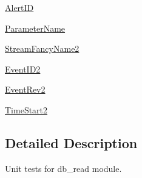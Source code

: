 \begin{DoxyCompactItemize}
\item 
\hyperlink{classamonpy_1_1dbase_1_1test_1_1test__db__read_1_1_test_d_b_read_adc41ecfc3c76fdd34341069786072911}{Alert\-I\-D}
\item 
\hyperlink{classamonpy_1_1dbase_1_1test_1_1test__db__read_1_1_test_d_b_read_a56e876914366660147a59978cc999d79}{Parameter\-Name}
\item 
\hyperlink{classamonpy_1_1dbase_1_1test_1_1test__db__read_1_1_test_d_b_read_ad24d241f9e0ae66844f79480d2ddfc93}{Stream\-Fancy\-Name2}
\item 
\hyperlink{classamonpy_1_1dbase_1_1test_1_1test__db__read_1_1_test_d_b_read_a16a0f37d14afbd09c98a8b403f177693}{Event\-I\-D2}
\item 
\hyperlink{classamonpy_1_1dbase_1_1test_1_1test__db__read_1_1_test_d_b_read_a857e1e2e776352c3615410f13f8e7f7b}{Event\-Rev2}
\item 
\hyperlink{classamonpy_1_1dbase_1_1test_1_1test__db__read_1_1_test_d_b_read_ae601f95c55daa72d31a753475e4aa7f5}{Time\-Start2}
\end{DoxyCompactItemize}


\subsection{Detailed Description}
\begin{DoxyVerb}   Unit tests for db_read module.
\end{DoxyVerb}
 

